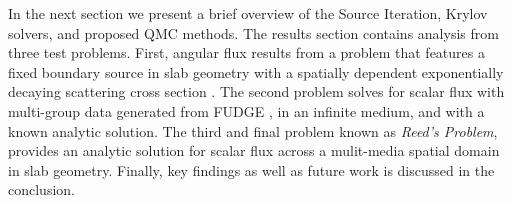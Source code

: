 In the next section we present a brief overview of the Source Iteration, Krylov solvers, and proposed QMC methods. The results section contains analysis from three test problems. First, angular flux results from a problem that features a fixed boundary source in slab geometry with a spatially dependent exponentially decaying scattering cross section \cite{cesinh}. The second problem solves for scalar flux with multi-group data generated from FUDGE \cite{mattoon2012generalized}, in an infinite medium, and with a known analytic solution. The third and final problem known as \textit{Reed's Problem}, provides an analytic solution for scalar flux across a mulit-media spatial domain \cite{Warsa2001} in slab geometry. Finally, key findings as well as future work is discussed in the conclusion.
\clearpage


